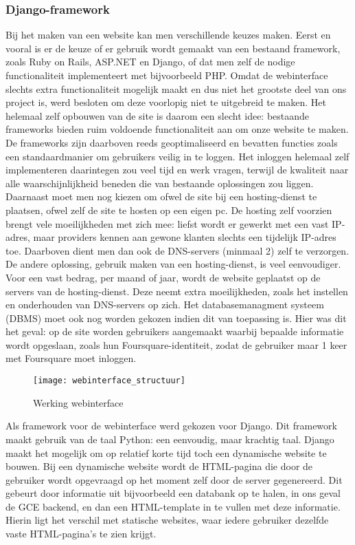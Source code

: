 \subsubsection{Django-framework}
Bij het maken van een website kan men verschillende keuzes maken.
Eerst en vooral is er de keuze of er gebruik wordt gemaakt van een bestaand framework, zoals Ruby on Rails, ASP.NET en Django, of dat men zelf de nodige functionaliteit implementeert met bijvoorbeeld PHP.
Omdat de webinterface slechts extra functionaliteit mogelijk maakt en dus niet het grootste deel van ons project is, werd besloten om deze voorlopig niet te uitgebreid te maken.
Het helemaal zelf opbouwen van de site is daarom een slecht idee: bestaande frameworks bieden ruim voldoende functionaliteit aan om onze website te maken. De frameworks zijn daarboven reeds geoptimaliseerd en bevatten functies zoals een standaardmanier om gebruikers veilig in te loggen. Het inloggen helemaal zelf implementeren daarintegen zou veel tijd en werk vragen, terwijl de kwaliteit naar alle waarschijnlijkheid beneden die van bestaande oplossingen zou liggen. 
Daarnaast moet men nog kiezen om ofwel de site bij een hosting-dienst te plaatsen, ofwel zelf de site te hosten op een eigen pc. De hosting zelf voorzien brengt vele moeilijkheden met zich mee: liefst wordt er gewerkt met een vast IP-adres, maar providers kennen aan gewone klanten slechts een tijdelijk IP-adres toe. Daarboven dient men dan ook de DNS-servers (minmaal 2) zelf te verzorgen.
De andere oplossing, gebruik maken van een hosting-dienst, is veel eenvoudiger. Voor een vast bedrag, per maand of jaar, wordt de website geplaatst op de servers van de hosting-dienst. Deze neemt extra moeilijkheden, zoals het instellen en onderhouden van DNS-servers op zich.
Het databasemanagment systeem (DBMS) moet ook nog worden gekozen indien dit van toepassing is. Hier was dit het geval: op de site worden gebruikers aangemaakt waarbij bepaalde informatie wordt opgeslaan, zoals hun Foursquare-identiteit, zodat de gebruiker maar 1 keer met Foursquare moet inloggen. \\
\begin{figure}[H]
	\centering
	\texttt{[image: webinterface\_structuur]}
	\caption{Werking webinterface}
	\label{fig:Webinterface}
\end{figure}
Als framework voor de webinterface werd gekozen voor Django. Dit framework maakt gebruik van de taal Python: een eenvoudig, maar krachtig taal. Django maakt het mogelijk om op relatief korte tijd toch een dynamische website te bouwen. Bij een dynamische website wordt de HTML-pagina die door de gebruiker wordt opgevraagd op het moment zelf door de server gegenereerd. Dit gebeurt door informatie uit bijvoorbeeld een databank op te halen, in ons geval de GCE backend, en dan een HTML-template in te vullen met deze informatie. Hierin ligt het verschil met statische websites, waar iedere gebruiker dezelfde vaste HTML-pagina's te zien krijgt.
